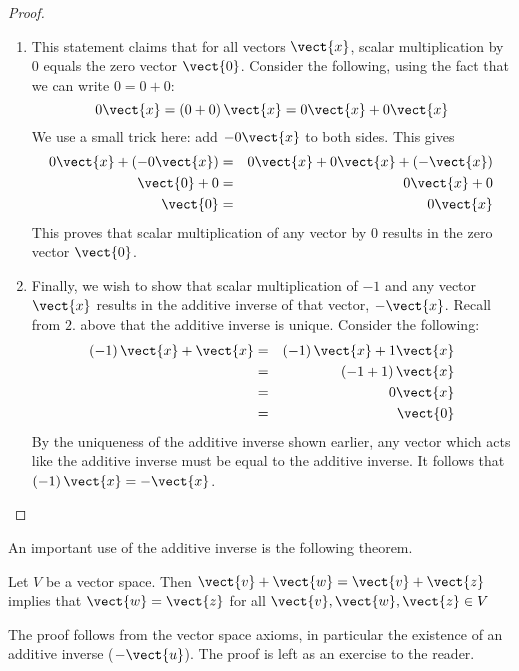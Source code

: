 \begin{proof}
\begin{enumerate}
\item
This statement claims that for all vectors $\vect{x}$, scalar multiplication by $0$ equals the zero vector $\vect{0}$. Consider the following, using the fact that we can write $0=0+0$:
\begin{equation*}
0\vect{x}=\left( 0+0\right) \vect{x}=0\vect{x}+0\vect{x}
\end{equation*}
We use a small trick here: add $-0\vect{x}$ to both sides. This gives 
\begin{eqnarray*}
0\vect{x} + (-0\vect{x})&=&0\vect{x}+0\vect{x}+(-\vect{x})\\
\vect{0} + 0 &=&0\vect{x} + 0 \\
\vect{0} &=& 0\vect{x}
\end{eqnarray*}
This proves that scalar multiplication of any vector by $0$ results in the zero vector $\vect{0}$. 

\item
Finally, we wish to show that scalar multiplication of $-1$ and any vector $\vect{x}$ results in the additive inverse of that vector, $-\vect{x}$. Recall from $2.$ above that the additive inverse is unique. 
Consider the following: 
\begin{eqnarray*}
\left( -1\right) \vect{x}+\vect{x} & =&\left( -1\right) \vect{x}+1\vect{x}\\
&=&\left(-1+1\right) \vect{x} \\
&=&0\vect{x} \\
&=&\vect{0}
\end{eqnarray*}
By the uniqueness of the additive inverse shown earlier, any vector which acts like the additive inverse must be equal to the additive inverse. It follows that $\left( -1\right) 
\vect{x}=-\vect{x}$.
\end{enumerate}
\end{proof}

An important use of the additive inverse is the following theorem.

\begin{theorem}{}{}
Let $V$ be a vector space. Then $\vect{v} + \vect{w} = \vect{v} + \vect{z}$ implies that $\vect{w} = \vect{z}$ for all $\vect{v}, \vect{w}, \vect{z} \in V$
\end{theorem}

The proof follows from the vector space axioms, in particular the existence of an additive inverse ($-\vect{u}$). The proof is left as an exercise to the reader. 
